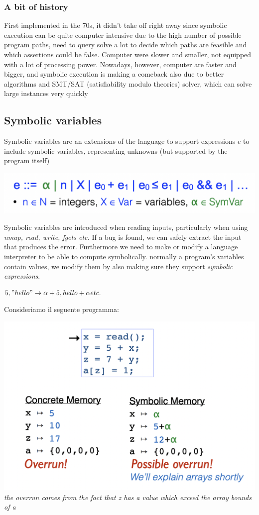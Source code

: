 \documentclass[11pt, oneside]{article}   	%
\begin{document}
\subsubsection*{A bit of history}
First implemented in the 70s, it didn't take off right away since symbolic execution can be quite computer intensive due to the high number of possible program paths, need to query solve a lot to decide which paths are feasible and which assertions could be false. Computer were slower and smaller, not equipped with a lot of processing power. Nowadays, however, computer are faster and bigger, and symbolic execution is making a comeback also due to better algorithms and SMT/SAT (satisfiability modulo theories) solver, which can solve large instances very quickly
\subsection*{Symbolic variables}
Symbolic variables are an extensions of the language to support expressions $e$ to include symbolic variables, representing unknowns (but supported by the program itself)
\begin{center}
\includegraphics[scale = 0.4]{dov3}
\end{center}
Symbolic variables are introduced when reading inputs, particularly when using \emph{nmap, read, write, fgets etc.} If a bug is found, we can safely extract the input that produces the error.
Furthermore we need to make or modify a language interpreter to be able to compute symbolically. normally a program's variables contain values, we modify them by also making sure they support \emph{symbolic expressions}.
\begin{center}
$5, "hello" \rightarrow \alpha + 5, hello + \alpha etc.$
\end{center}
Consideriamo il seguente programma:
\begin{center}
\includegraphics[scale = 0.4]{dov4}\\
\emph{the overrun comes from the fact that z has a value which exceed the array bounds of a}
\end{center}
\end{document}
